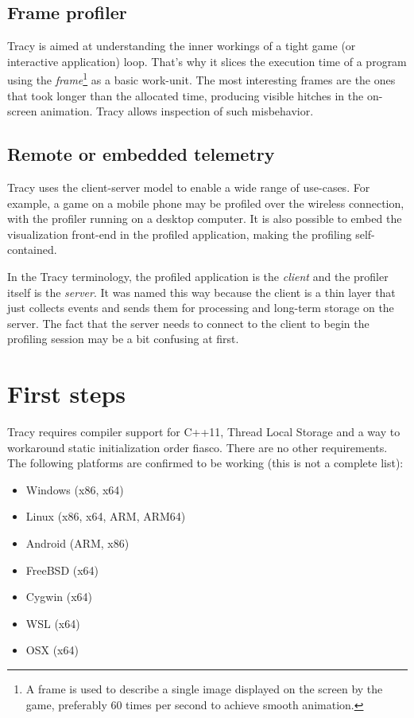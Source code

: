 \documentclass[hidelinks,titlepage,a4paper]{article}
\begin{document}
\subsection{Frame profiler}

Tracy is aimed at understanding the inner workings of a tight game (or interactive application) loop. That's why it slices the execution time of a program using the \emph{frame}\footnote{A frame is used to describe a single image displayed on the screen by the game, preferably 60 times per second to achieve smooth animation.} as a basic work-unit. The most interesting frames are the ones that took longer than the allocated time, producing visible hitches in the on-screen animation. Tracy allows inspection of such misbehavior.

\subsection{Remote or embedded telemetry}

Tracy uses the client-server model to enable a wide range of use-cases. For example, a game on a mobile phone may be profiled over the wireless connection, with the profiler running on a desktop computer. It is also possible to embed the visualization front-end in the profiled application, making the profiling self-contained.

In the Tracy terminology, the profiled application is the \emph{client} and the profiler itself is the \emph{server}. It was named this way because the client is a thin layer that just collects events and sends them for processing and long-term storage on the server. The fact that the server needs to connect to the client to begin the profiling session may be a bit confusing at first.

\section{First steps}

Tracy requires compiler support for C++11, Thread Local Storage and a way to workaround static initialization order fiasco. There are no other requirements. The following platforms are confirmed to be working (this is not a complete list):

\begin{itemize}
\item Windows (x86, x64)
\item Linux (x86, x64, ARM, ARM64)
\item Android (ARM, x86)
\item FreeBSD (x64)
\item Cygwin (x64)
\item WSL (x64)
\item OSX (x64)
\end{itemize}
\end{document}
